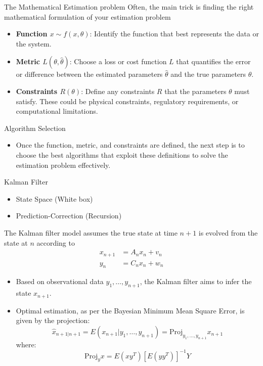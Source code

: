 \documentclass{beamer}
\begin{document}
\begin{frame}{The Mathematical Estimation problem}
Often, the main trick is finding the right mathematical formulation of your estimation problem 
\begin{itemize}
  \item \textbf{Function \( x \sim f(x, \theta) \)}: Identify the function that best represents the data or the system.
  \item \textbf{Metric \( L(\theta, \hat{\theta}) \)}: Choose a loss or cost function \( L \) that quantifies the error or difference between the estimated parameters \( \hat{\theta} \) and the true parameters \( \theta \).
  \item \textbf{Constraints \( R(\theta) \)}: Define any constraints \( R \) that the parameters \( \theta \) must satisfy. These could be physical constraints, regulatory requirements, or computational limitations.
\end{itemize}

\begin{block}{Algorithm Selection}
  \begin{itemize}
      \item Once the function, metric, and  constraints are defined, the next step is to choose the best algorithms that 
      exploit these definitions to solve the estimation problem effectively.
  \end{itemize}
\end{block}

\end{frame}



\begin{frame}{Kalman Filter}
  \begin{itemize}
          \item State Space (White box)
          \item Prediction-Correction (Recursion)
  \end{itemize}
  The Kalman filter model assumes the true state at time $n+1$ is evolved from the state at $n$ according to
  \begin{align*}
    x_{n+1} &= A_n x_n + v_n \\
    y_n &= C_n x_n + w_n
  \end{align*}
  
  \begin{itemize}
    \item Based on observational data \( y_1, \ldots, y_{n+1} \), the Kalman filter aims to infer the state \( x_{n+1} \).
    \item Optimal estimation, as per the Bayesian Minimum Mean Square Error, is given by the projection:
    \begin{equation*}
      \hat{x}_{n+1|n+1} = E(x_{n+1} | y_1, \ldots, y_{n+1}) = \text{Proj}_{y_1,\ldots,y_{n+1}} x_{n+1}
    \end{equation*}
  where:
    $$
  \text{Proj}_{y} x = E(xy^{T})[E(yy^{T})]^{-1}Y
  $$
  \end{itemize}
  
  \end{frame}
  
\end{document}
